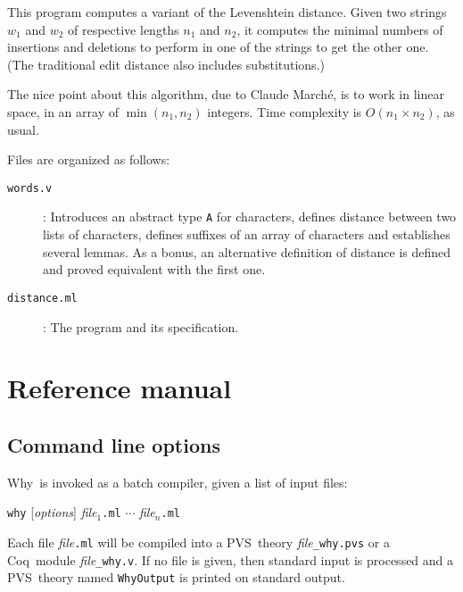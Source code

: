 \documentclass[a4paper,12pt]{report}
\newcommand{\pvs}{\textsf{PVS}}
\newcommand{\coq}{\textsf{Coq}}
\newcommand{\why}{\textsf{Why}}
\begin{document}

This program computes a variant of the Levenshtein distance. Given two
strings $w_1$ and $w_2$ of respective lengths $n_1$ and $n_2$, it
computes the minimal numbers of insertions and deletions to perform in
one of the strings to get the other one.  (The traditional edit
distance also includes substitutions.)

The nice point about this algorithm, due to Claude March\'e, is to work
in linear space, in an array of $\min(n_1,n_2)$ integers. Time
complexity is $O(n_1\times n_2)$, as usual.

Files are organized as follows:
\begin{description}
\item[\texttt{words.v}]: 
  Introduces an abstract type \texttt{A} for
  characters, defines distance between two lists of characters,
  defines suffixes of an array of characters and establishes several
  lemmas.  As a bonus, an alternative definition of distance is
  defined and proved equivalent with the first one.
\item[\texttt{distance.ml}]:
  The program and its specification.  
\end{description}


\chapter{Reference manual}
\label{refman}


\section{Command line options}
\label{usage}

\why\ is invoked as a batch compiler, given a list of input files:
\begin{center}
  \texttt{why} [\textit{options}] \textit{file}$_1$\texttt{.ml} $\cdots$
    \textit{file}$_n$\texttt{.ml}
\end{center}
Each file \textit{file}\texttt{.ml} will be compiled into a \pvs\ theory
\textit{file}\texttt{\_why.pvs} or a \coq\ module
\textit{file}\texttt{\_why.v}.
If no file is given, then standard input is processed and a \pvs\ theory
named \texttt{WhyOutput} is printed on standard output.
\end{document}
